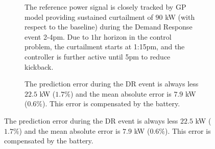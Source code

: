 %	
%	
%		
\begin{figure}[t!]
	\centering
	\begin{subfigure}
		\centering
		\setlength{}
		\setlength{}	
		
		\caption{The reference power signal is closely tracked by GP model providing sustained curtailment of \(90\) kW (with respect to the baseline) during the Demand Response event 2-4pm. Due to \(1\)hr horizon in the control problem, the curtailment starts at 1:15pm, and the controller is further active until 5pm to reduce kickback.}
		\label{F:control:tracking}
	\end{subfigure}
	\begin{subfigure}
		\centering
		\setlength{}
		\setlength{}	
		
		\caption{The prediction error during the DR event is always less \(22.5\) kW (\(1.7\%\)) and the mean absolute error is \(7.9\) kW (\(0.6\%\)). This error is compensated by the battery.}
		\label{F:control:error}
	\end{subfigure}
%			
%		
%		

\end{figure}
